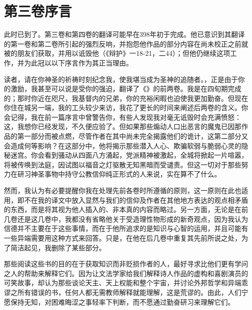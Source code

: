 
\section{第三卷序言}

此时已到了。第三卷和第四卷的翻译可能早在398年初于完成。他已意识到其翻译的第一卷和第二卷所引起的强烈反响，并抱怨他作品的部分内容在尚未校正之前就被的朋友们获取，并用以诋毁他（《辩护》一18-21，二44）；但他仍继续这项工作，并为此冠以以下序言作为其正当理由。\par

读者，请在你神圣的祈祷时刻纪念我，使我堪当成为圣神的追随者。，正是由于你的激励，我甚至可以说是受你的强迫，翻译了《》的前两卷。我是在四旬期完成的；那时你近在咫尺，我基督内的兄弟，你的充裕闲暇也迫使我更加勤奋。但现在你住在城另一端，我的工头较少来访，我花了更长的时间来阐述后两卷的含义。你会记得，我在前一篇序言中曾警告你，有些人发现我对毫无诋毁时会充满愤怒：这，我想你已经发现，不久便应验了。但如果那些煽动人口出恶言的魔鬼已因那作品的第一部分而被点燃，尽管作者在其中尚未完全揭露他们的诡计，这第二部分又会造成何等影响？在这部分中，他将揭示那些潜入人心、欺骗软弱与脆弱心灵的隐秘迷宫。你会看到骚动从四面八方涌起，党派精神被激起，全城将掀起一片喧嚣，将被传唤到法庭，因试图以福音之灯驱散无知黑暗而受谴责。但这一切对于那些努力在研习神圣事物中持守公教信仰纯正形式的人来说，实在算不了什么。\par

然而，我认为有必要提醒你我在处理先前各卷时所遵循的原则，这一原则在此也适用，即不在我的译文中放入显然与我们的信仰及作者在其他地方表达的观点相矛盾的东西，而是将其视为他人插入的、非本真的内容而略过。另一方面，无论是在前几卷还是这几卷中，我都没有省略他关于受造理性物形成的新奇观点，因为我认为信德并不主要在于这些事情，而在于他所追求的是知识与心智的运用，并且可能有一些异端需要用这种方式来回答。只是，在他在后几卷中重复其先前所说之处，为了简洁起见，我删除了某些部分。\par

那些阅读这些书的目的在于获取知识而非贬损作者的人，最好寻求比他们更有学问之人的帮助来解释它们。因为让文法学家给我们解释诗人作品的虚构和喜剧演员的可笑故事，却认为那些谈论天主、天上权能和整个宇宙，并讨论外邦哲学和异端乖谬之所有错误的书，任何人都无需教师解释就能理解，这是荒谬的。由此，人们宁愿保持无知，对困难晦涩之事轻率下判断，而不愿通过勤奋研习来理解它们。\par

